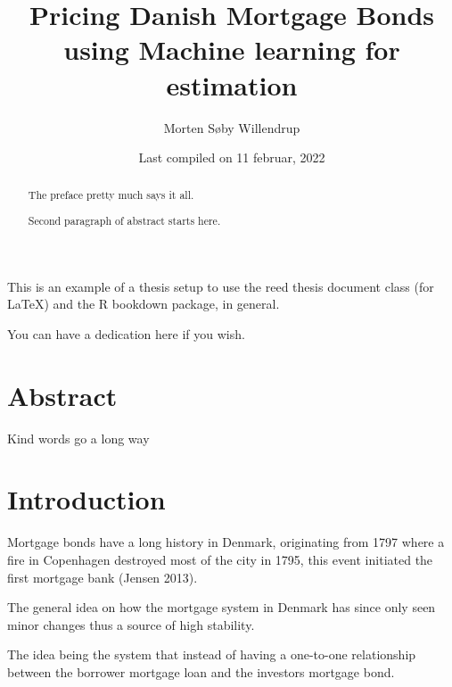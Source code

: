 \documentclass[12pt,twoside]{reedthesis}
\title{Pricing Danish Mortgage Bonds using Machine learning for estimation}
\author{Morten Søby Willendrup}
\date{Last compiled on 11 februar, 2022}
\begin{document}
  \maketitle

\frontmatter %
\pagestyle{empty} %

  \begin{preface}
    This is an example of a thesis setup to use the reed thesis document class
    (for LaTeX) and the R bookdown package, in general.
  \end{preface}
  \hypersetup{linkcolor=black}
  \setcounter{secnumdepth}{2}
  \setcounter{tocdepth}{2}
  \tableofcontents

  \listoftables

  \listoffigures
  \begin{abstract}
    The preface pretty much says it all.

    \par

    Second paragraph of abstract starts here.
  \end{abstract}
  \begin{dedication}
    You can have a dedication here if you wish.
  \end{dedication}
\mainmatter %
\pagestyle{fancyplain} %

\hypertarget{abstract}{%
\chapter*{Abstract}\label{abstract}}

Kind words go a long way

\hypertarget{intro}{%
\chapter{Introduction}\label{intro}}

Mortgage bonds have a long history in Denmark, originating from 1797 where a fire in Copenhagen destroyed most of the city in 1795, this event initiated the first mortgage bank (Jensen 2013).

The general idea on how the mortgage system in Denmark has since only seen minor changes thus a source of high stability.

The idea being the system that instead of having a one-to-one relationship between the borrower mortgage loan and the investors mortgage bond.
\end{document}

